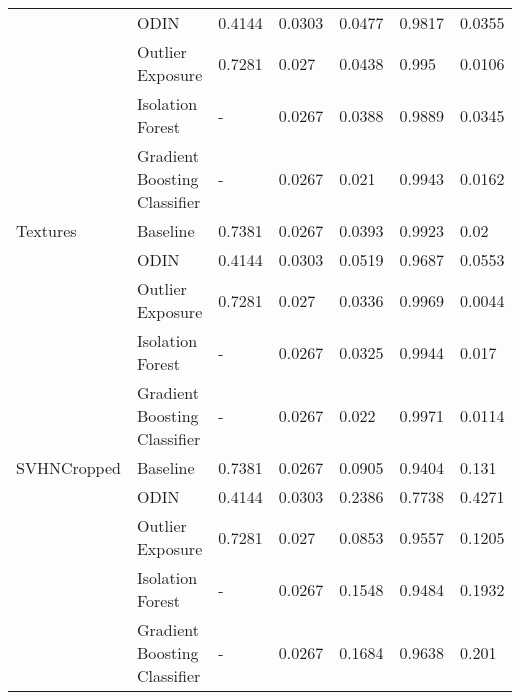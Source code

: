 \begin{tabular}{lllllll}
            & ODIN &        0.4144 &               0.0303 &    0.0477 &  0.9817 &         0.0355 \\
            & Outlier Exposure &        0.7281 &                0.027 &    0.0438 &   0.995 &         0.0106 \\
            & Isolation Forest &             - &               0.0267 &    0.0388 &  0.9889 &         0.0345 \\
            & Gradient Boosting Classifier &             - &               0.0267 &     0.021 &  0.9943 &         0.0162 \\
Textures & Baseline &        0.7381 &               0.0267 &    0.0393 &  0.9923 &           0.02 \\
            & ODIN &        0.4144 &               0.0303 &    0.0519 &  0.9687 &         0.0553 \\
            & Outlier Exposure &        0.7281 &                0.027 &    0.0336 &  0.9969 &         0.0044 \\
            & Isolation Forest &             - &               0.0267 &    0.0325 &  0.9944 &          0.017 \\
            & Gradient Boosting Classifier &             - &               0.0267 &     0.022 &  0.9971 &         0.0114 \\
SVHNCropped & Baseline &        0.7381 &               0.0267 &    0.0905 &  0.9404 &          0.131 \\
            & ODIN &        0.4144 &               0.0303 &    0.2386 &  0.7738 &         0.4271 \\
            & Outlier Exposure &        0.7281 &                0.027 &    0.0853 &  0.9557 &         0.1205 \\
            & Isolation Forest &             - &               0.0267 &    0.1548 &  0.9484 &         0.1932 \\
            & Gradient Boosting Classifier &             - &               0.0267 &    0.1684 &  0.9638 &          0.201 \\
\bottomrule
\end{tabular}
